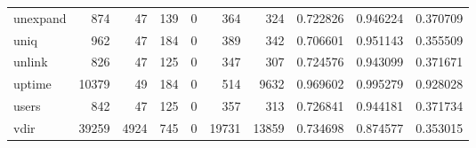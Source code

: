 \begin{tabular}{lrrrrrrrrr}
unexpand  &                                 874 &                                              47 &                                            139 &                                             0 &                                            364 &                                          324 &                                           0.722826 &                               0.946224 &                             0.370709 \\
uniq      &                                 962 &                                              47 &                                            184 &                                             0 &                                            389 &                                          342 &                                           0.706601 &                               0.951143 &                             0.355509 \\
unlink    &                                 826 &                                              47 &                                            125 &                                             0 &                                            347 &                                          307 &                                           0.724576 &                               0.943099 &                             0.371671 \\
uptime    &                               10379 &                                              49 &                                            184 &                                             0 &                                            514 &                                         9632 &                                           0.969602 &                               0.995279 &                             0.928028 \\
users     &                                 842 &                                              47 &                                            125 &                                             0 &                                            357 &                                          313 &                                           0.726841 &                               0.944181 &                             0.371734 \\
vdir      &                               39259 &                                            4924 &                                            745 &                                             0 &                                          19731 &                                        13859 &                                           0.734698 &                               0.874577 &                             0.353015 \\

\end{tabular}
